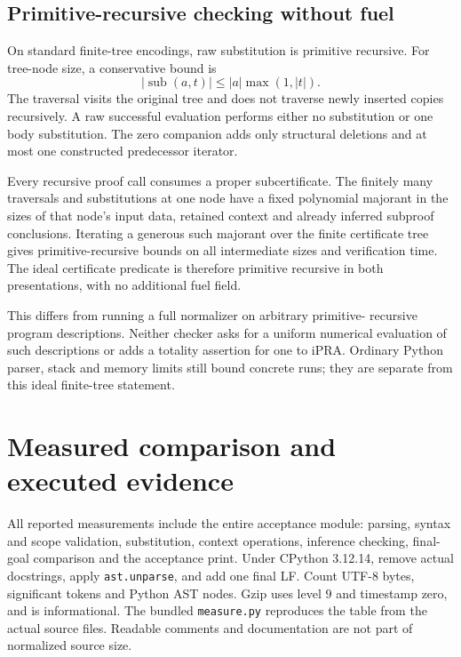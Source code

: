 \documentclass[11pt,letterpaper]{article}
\theoremstyle{definition}\newtheorem{definition}[theorem]{Definition}
\theoremstyle{remark}\newtheorem{remark}[theorem]{Remark}
\begin{document}
\subsection{Primitive-recursive checking without fuel}

On standard finite-tree encodings, raw substitution is primitive recursive.
For tree-node size, a conservative bound is
\[
                |\operatorname{sub}(a,t)|
                \le |a|\max(1,|t|).
\]
The traversal visits the original tree and does not traverse newly inserted
copies recursively. A raw successful evaluation performs either no
substitution or one body substitution. The zero companion adds only
structural deletions and at most one constructed predecessor iterator.

Every recursive proof call consumes a proper subcertificate. The finitely
many traversals and substitutions at one node have a fixed polynomial
majorant in the sizes of that node's input data, retained context and
already inferred subproof conclusions. Iterating a generous such majorant
over the finite certificate tree gives primitive-recursive bounds on all
intermediate sizes and verification time. The ideal certificate predicate
is therefore primitive recursive in both presentations, with no additional
fuel field.

This differs from running a full normalizer on arbitrary primitive-
recursive program descriptions. Neither checker asks for a uniform numerical
evaluation of such descriptions or adds a totality assertion for one to
iPRA. Ordinary Python parser, stack and memory limits still bound concrete
runs; they are separate from this ideal finite-tree statement.

\section{Measured comparison and executed evidence}
\label{sec:metrics}

All reported measurements include the entire acceptance module: parsing,
syntax and scope validation, substitution, context operations, inference
checking, final-goal comparison and the acceptance print. Under CPython
3.12.14, remove actual docstrings, apply \texttt{ast.unparse}, and add one
final LF. Count UTF-8 bytes, significant tokens and Python AST nodes.
Gzip uses level $9$ and timestamp zero, and is informational.
The bundled \texttt{measure.py} reproduces the table from the actual source
files. Readable comments and documentation are not part of normalized
source size.
\end{document}
